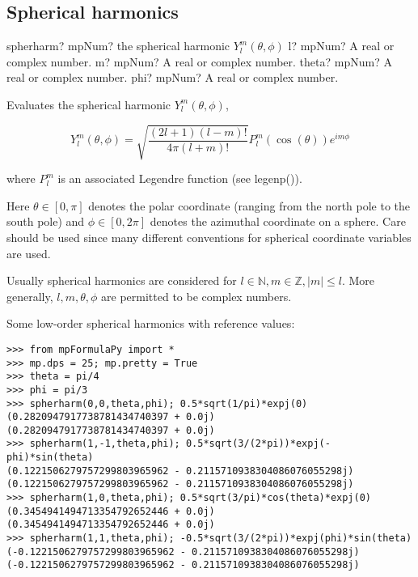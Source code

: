 \subsection{Spherical harmonics}

\begin{mpFunctionsExtract}
	\mpFunctionFour
	{spherharm? mpNum? the spherical harmonic $Y_l^m(\theta,\phi)$}
	{l? mpNum? A real or complex number.}
	{m? mpNum? A real or complex number.}
	{theta? mpNum? A real or complex number.}	
	{phi? mpNum? A real or complex number.}		
\end{mpFunctionsExtract}


\vpara
Evaluates the spherical harmonic $Y_l^m(\theta,\phi)$,

\begin{equation}
Y_l^m(\theta,\phi) = \sqrt{\frac{(2l+1)(l-m)!}{4\pi (l+m)!}} P_l^m(\cos(\theta))e^{i m \phi}
\end{equation}

where $P_l^m$ is an associated Legendre function (see legenp()).

Here $\theta \in [0,\pi]$ denotes the polar coordinate (ranging from the north pole to the south pole) and $\phi \in [0,2\pi]$ denotes the azimuthal coordinate on a sphere. Care should be used since many different conventions for spherical coordinate variables are used.

\vpara
Usually spherical harmonics are considered for $l \in \mathbb{N}, m \in \mathbb{Z}, |m| \leq l$. More generally, $l, m, \theta, \phi$ are permitted to be complex numbers.

Some low-order spherical harmonics with reference values:

\begin{lstlisting}
>>> from mpFormulaPy import *
>>> mp.dps = 25; mp.pretty = True
>>> theta = pi/4
>>> phi = pi/3
>>> spherharm(0,0,theta,phi); 0.5*sqrt(1/pi)*expj(0)
(0.2820947917738781434740397 + 0.0j)
(0.2820947917738781434740397 + 0.0j)
>>> spherharm(1,-1,theta,phi); 0.5*sqrt(3/(2*pi))*expj(-phi)*sin(theta)
(0.1221506279757299803965962 - 0.2115710938304086076055298j)
(0.1221506279757299803965962 - 0.2115710938304086076055298j)
>>> spherharm(1,0,theta,phi); 0.5*sqrt(3/pi)*cos(theta)*expj(0)
(0.3454941494713354792652446 + 0.0j)
(0.3454941494713354792652446 + 0.0j)
>>> spherharm(1,1,theta,phi); -0.5*sqrt(3/(2*pi))*expj(phi)*sin(theta)
(-0.1221506279757299803965962 - 0.2115710938304086076055298j)
(-0.1221506279757299803965962 - 0.2115710938304086076055298j)
\end{lstlisting}




